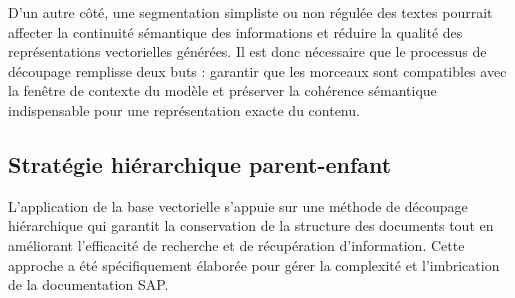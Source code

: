 D'un autre côté, une segmentation simpliste ou non régulée des textes pourrait affecter la continuité sémantique des informations et réduire la qualité des représentations vectorielles générées. Il est donc nécessaire que le processus de découpage remplisse deux buts : garantir que les morceaux sont compatibles avec la fenêtre de contexte du modèle et préserver la cohérence sémantique indispensable pour une représentation exacte du contenu.
\subsection{Stratégie hiérarchique parent-enfant}

L'application de la base vectorielle s'appuie sur une méthode de découpage hiérarchique qui garantit la conservation de la structure des documents tout en améliorant l'efficacité de recherche et de récupération d'information. Cette approche a été spécifiquement élaborée pour gérer la complexité et l'imbrication de la documentation SAP.

